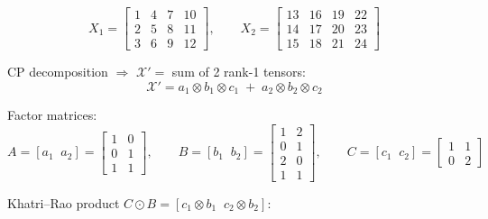 \documentclass[12pt]{article}
\newcommand{\T}[1]{\mathcal{#1}}   %
\begin{document}
\begin{equation}
X_1 =
\begin{bmatrix}
 1 &  4 &  7 & 10 \\
 2 &  5 &  8 & 11 \\
 3 &  6 &  9 & 12
\end{bmatrix},
\qquad
X_2 =
\begin{bmatrix}
13 & 16 & 19 & 22 \\
14 & 17 & 20 & 23 \\
15 & 18 & 21 & 24
\end{bmatrix}
\end{equation}

CP decomposition $\Rightarrow$ $\T{X}' =$ sum of 2 rank-1 tensors:
\begin{equation}
\T{X}' = a_1 \otimes b_1 \otimes c_1 \;+\; a_2 \otimes b_2 \otimes c_2
\end{equation}

\noindent Factor matrices:
\begin{equation}
A = [a_1 \;\; a_2] =
\begin{bmatrix} 1 & 0 \\ 0 & 1 \\ 1 & 1 \end{bmatrix},
\qquad
B = [b_1 \;\; b_2] =
\begin{bmatrix} 1 & 2 \\ 0 & 1 \\ 2 & 0 \\ 1 & 1 \end{bmatrix},
\qquad
C = [c_1 \;\; c_2] =
\begin{bmatrix} 1 & 1 \\ 0 & 2 \end{bmatrix}
\end{equation}

\noindent Khatri--Rao product $C \odot B = [c_1 \otimes b_1 \;\; c_2 \otimes b_2]$:
\end{document}
